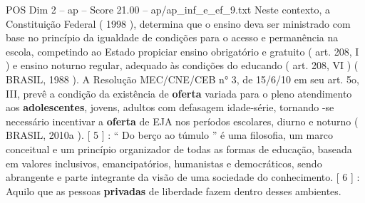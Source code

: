 \begin{textsample}{POS Dim 2 – ap – Score 21.00 – ap/ap\_inf\_e\_ef\_9.txt}
Neste contexto, a Constituição Federal ( 1998 ), determina que o ensino deva ser ministrado com base no princípio da igualdade de condições para o acesso e permanência na escola, competindo ao Estado propiciar ensino obrigatório e gratuito ( art. 208, I ) e ensino noturno regular, adequado às condições do educando ( art. 208, VI ) ( BRASIL, 1988 ).
A Resolução MEC/CNE/CEB n{\EmojiFont °} 3, de 15/6/10 em seu art. 5o, III, prevê a condição da existência de \textbf{oferta} variada para o pleno atendimento aos \textbf{adolescentes}, jovens, adultos com defasagem idade-série, tornando -se necessário incentivar a \textbf{oferta} de EJA nos períodos escolares, diurno e noturno ( BRASIL, 2010a ). [ 5 ] : “ Do berço ao túmulo ” é uma filosofia, um marco conceitual e um princípio organizador de todas as formas de educação, baseada em valores inclusivos, emancipatórios, humanistas e democráticos, sendo abrangente e parte integrante da visão de uma sociedade do conhecimento. [ 6 ] : Aquilo que as pessoas \textbf{privadas} de liberdade fazem dentro desses ambientes.

\end{textsample}
